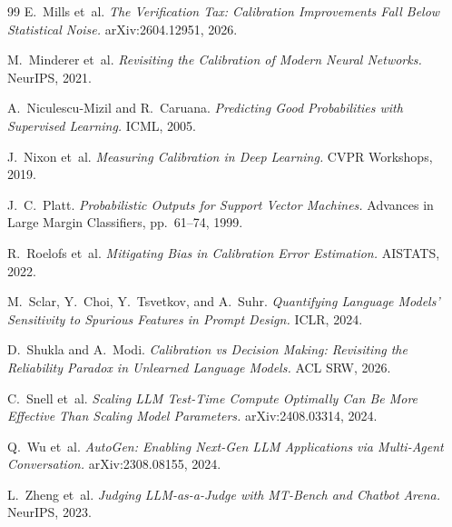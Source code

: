 \documentclass[11pt]{article}
\begin{document}
\begin{thebibliography}{99}
 E.~Mills et~al.
\newblock \textit{The Verification Tax: Calibration Improvements Fall Below Statistical Noise.}
\newblock arXiv:2604.12951, 2026.

 M.~Minderer et~al.
\newblock \textit{Revisiting the Calibration of Modern Neural Networks.}
\newblock NeurIPS, 2021.

 A.~Niculescu-Mizil and R.~Caruana.
\newblock \textit{Predicting Good Probabilities with Supervised Learning.}
\newblock ICML, 2005.

 J.~Nixon et~al.
\newblock \textit{Measuring Calibration in Deep Learning.}
\newblock CVPR Workshops, 2019.

 J.~C.~Platt.
\newblock \textit{Probabilistic Outputs for Support Vector Machines.}
\newblock Advances in Large Margin Classifiers, pp.~61--74, 1999.

 R.~Roelofs et~al.
\newblock \textit{Mitigating Bias in Calibration Error Estimation.}
\newblock AISTATS, 2022.

 M.~Sclar, Y.~Choi, Y.~Tsvetkov, and A.~Suhr.
\newblock \textit{Quantifying Language Models' Sensitivity to Spurious Features in Prompt Design.}
\newblock ICLR, 2024.

 D.~Shukla and A.~Modi.
\newblock \textit{Calibration vs Decision Making: Revisiting the Reliability Paradox in Unlearned Language Models.}
\newblock ACL SRW, 2026.

 C.~Snell et~al.
\newblock \textit{Scaling LLM Test-Time Compute Optimally Can Be More Effective Than Scaling Model Parameters.}
\newblock arXiv:2408.03314, 2024.

 Q.~Wu et~al.
\newblock \textit{AutoGen: Enabling Next-Gen LLM Applications via Multi-Agent Conversation.}
\newblock arXiv:2308.08155, 2024.

 L.~Zheng et~al.
\newblock \textit{Judging LLM-as-a-Judge with MT-Bench and Chatbot Arena.}
\newblock NeurIPS, 2023.

\end{thebibliography}
\end{document}
